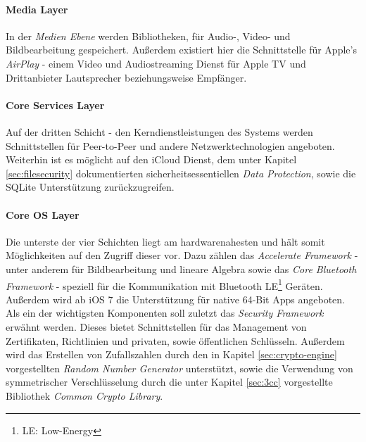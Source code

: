		\paragraph{Media Layer}
			In der \textsl{Medien Ebene} werden Bibliotheken, für
			Audio-, Video- und Bildbearbeitung gespeichert. Außerdem existiert hier die
			Schnittstelle für Apple's \textsl{AirPlay} - einem Video und Audiostreaming
			Dienst für Apple TV und Drittanbieter Lautsprecher beziehungsweise Empfänger.
		\paragraph{Core Services Layer}
			Auf der dritten Schicht - den Kerndienstleistungen des Systems werden
			Schnittstellen für Peer-to-Peer und andere Netzwerktechnologien angeboten.
			Weiterhin ist es möglicht auf den iCloud Dienst, dem unter Kapitel
			\ref{sec:filesecurity} dokumentierten sicherheitsessentiellen \textsl{Data
			Protection}, sowie die SQLite Unterstützung zurückzugreifen.
		\paragraph{Core OS Layer}
			Die unterste der vier Schichten liegt am hardwarenahesten und hält somit
			Möglichkeiten auf den Zugriff dieser vor. Dazu zählen das \textsl{Accelerate
			Framework} - unter anderem für Bildbearbeitung und lineare Algebra sowie das
			\textsl{Core Bluetooth Framework} - speziell für die Kommunikation mit
			Bluetooth LE\footnote{LE: Low-Energy} Geräten. Außerdem wird ab iOS 7
			die Unterstützung für native 64-Bit Apps angeboten. Als ein der wichtigsten
			Komponenten soll zuletzt das \textsl{Security Framework} erwähnt werden.
			Dieses bietet Schnittstellen für das Management von Zertifikaten, Richtlinien
			und privaten, sowie öffentlichen Schlüsseln. Außerdem wird das Erstellen von
			Zufallszahlen durch den in Kapitel \ref{sec:crypto-engine}
			vorgestellten \textsl{Random Number Generator} unterstützt, sowie die
			Verwendung von symmetrischer Verschlüsselung durch die unter Kapitel
			\ref{sec:3cc} vorgestellte Bibliothek \textsl{Common Crypto Library}.
